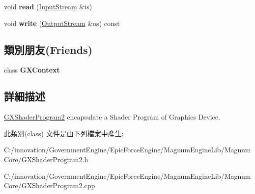 \begin{DoxyCompactItemize}
\item 
void {\bfseries read} (\hyperlink{class_i_dream_sky_1_1_input_stream}{Input\+Stream} \&is)\hypertarget{class_magnum_1_1_g_x_shader_program2_aec1ae6026468cbfc6a7c0215f0f2a336}{}\label{class_magnum_1_1_g_x_shader_program2_aec1ae6026468cbfc6a7c0215f0f2a336}

\item 
void {\bfseries write} (\hyperlink{class_i_dream_sky_1_1_output_stream}{Output\+Stream} \&os) const \hypertarget{class_magnum_1_1_g_x_shader_program2_a212b7c960a7688a77be12b9766d31e56}{}\label{class_magnum_1_1_g_x_shader_program2_a212b7c960a7688a77be12b9766d31e56}

\end{DoxyCompactItemize}
\subsection*{類別朋友(Friends)}
\begin{DoxyCompactItemize}
\item 
class {\bfseries G\+X\+Context}\hypertarget{class_magnum_1_1_g_x_shader_program2_a2c36d7f8865080802bbad88cd73d871c}{}\label{class_magnum_1_1_g_x_shader_program2_a2c36d7f8865080802bbad88cd73d871c}

\end{DoxyCompactItemize}


\subsection{詳細描述}
\hyperlink{class_magnum_1_1_g_x_shader_program2}{G\+X\+Shader\+Program2} encapsulate a Shader Program of Graphics Device. 

此類別(class) 文件是由下列檔案中產生\+:\begin{DoxyCompactItemize}
\item 
C\+:/innovation/\+Government\+Engine/\+Epic\+Force\+Engine/\+Magnum\+Engine\+Lib/\+Magnum\+Core/G\+X\+Shader\+Program2.\+h\item 
C\+:/innovation/\+Government\+Engine/\+Epic\+Force\+Engine/\+Magnum\+Engine\+Lib/\+Magnum\+Core/G\+X\+Shader\+Program2.\+cpp\end{DoxyCompactItemize}
